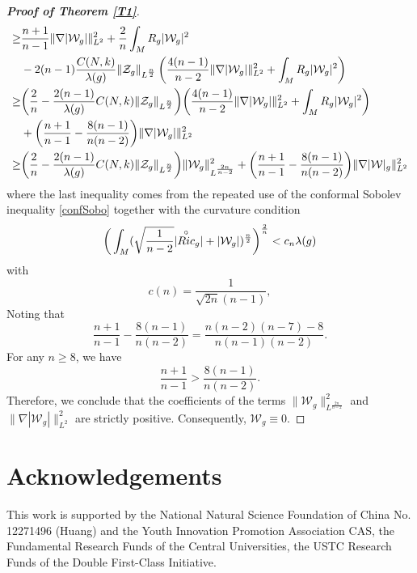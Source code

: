 \documentclass[12pt, twoside]{article}
\theoremstyle{definition}
\numberwithin{equation}{section}
\def \la {\lambda}
\def\na {\nabla}
\begin{document}
\begin{proof}[\textbf{Proof of Theorem \ref{T1}}]
\begin{equation*}
\begin{split}
		\geq&\frac{n+1}{n-1}\|\na |\mathcal{W}_{g}|\|^{2}_{L^{2}}+\frac{2}{n}\int_{M}R_{g}|\mathcal{W}_{g}|^{2}\\
		&-2(n-1)\frac{C(N,k)}{\la(g)}\|\mathcal{Z}_{g}\|_{L^{ \frac{n}{2} }}\left(\frac{4(n-1)}{n-2 }\|\na|\mathcal{W}_{g}|\|^{2}_{L^{2}}+\int_{M}R_{g}|\mathcal{W}_{g}|^{2}\right)\\
		\geq &\bigg{(}\frac{2}{n}-\frac{2(n-1)}{\la(g)}C(N,k)\|\mathcal{Z}_{g}\|_{L^{ \frac{n}{2} }}\bigg{)}\bigg{(}\frac{4(n-1)}{n-2}\|\na|\mathcal{W}_{g}|\|^{2}_{L^{2}}+\int_{M}R_{g}|\mathcal{W}_{g}|^{2}\bigg{)}\\
		&+\bigg{(}\frac{n+1}{n-1}-\frac{8(n-1)}{n(n-2)}\bigg{)}\|\na|\mathcal{W}_{g}|\|^{2}_{L^{2}}\\
		\geq &\bigg{(}\frac{2}{n}-\frac{2(n-1)}{\la(g)}C(N,k)\|\mathcal{Z}_{g}\|_{L^{ \frac{n}{2} }}\bigg{)}\|\mathcal{W}_{g}\|^{2}_{L^{\frac{2n}{n-2} }}+\bigg{(}\frac{n+1}{n-1}-\frac{8(n-1)}{n(n-2)}\bigg{)}\|\na|\mathcal{W}|_{g}\|^{2}_{L^{2}}\\
		\end{split}
		\end{equation*}
		where the last inequality comes from the repeated use of the conformal  Sobolev inequality \eqref{confSobo} together with the  curvature condition  $$ \bigg{(}\int_{M}(\sqrt{\frac{ 1}{n-2}}|\overset{\circ}{Ric}_{g}|+|\mathcal{W}_{g}|)^{\frac{n}{2}}\bigg{)}^{\frac{2}{n} }<c_{n}\la(g)$$
		with
		$$c(n)=\frac{1}{\sqrt{2n}(n-1)},$$
			Noting that
		\begin{equation*}
		\frac{n+1}{n-1}-\frac{8(n-1)}{n(n-2)}=\frac{n(n-2)(n-7)-8 }{n(n-1)(n-2)} .
		\end{equation*}	
		For any $n\geq8$, we have
		\begin{equation*}
		\frac{n+1}{n-1}>\frac{8(n-1)}{n(n-2)}.
		\end{equation*}	
		Therefore, we conclude that the coefficients of the terms $\|\mathcal{W}_{g}\|^{2}_{L^{\frac{2n}{n-2} } }$ and $\|\na |\mathcal{W}_{g}|\|^{2}_{L^{2}}$ are  strictly positive. 	Consequently, $\mathcal{W}_g \equiv 0$.
		
	
\end{proof}



\section*{Acknowledgements}
This work is supported by the National Natural Science Foundation of China No. 12271496 (Huang) and the Youth Innovation Promotion Association CAS, the Fundamental Research Funds of the Central Universities, the USTC Research Funds of the Double First-Class Initiative. 
\end{document}
